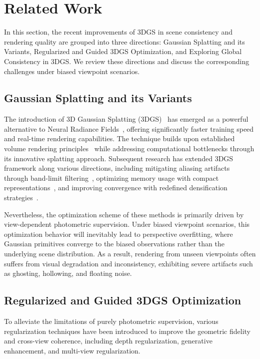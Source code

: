 \documentclass[lettersize,journal]{IEEEtran}
\begin{document}
\section{Related Work}

In this section, the recent improvements of 3DGS in scene consistency and rendering quality are grouped into three directions: Gaussian Splatting and its Variants, Regularized and Guided 3DGS Optimization, and Exploring Global Consistency in 3DGS. We review these directions and discuss the corresponding challenges under biased viewpoint scenarios.

\subsection{Gaussian Splatting and its Variants}

The introduction of 3D Gaussian Splatting (3DGS)~\cite{3dgs} has emerged as a powerful alternative to Neural Radiance Fields~\cite{nerf}, offering significantly faster training speed and real-time rendering capabilities. 
The technique builds upon established volume rendering principles~\cite{ewa} while addressing computational bottlenecks through its innovative splatting approach. 
Subsequent research has extended 3DGS framework along various directions, including mitigating aliasing artifacts through band-limit filtering~\cite{mipsplatting}, optimizing memory usage with compact representations~\cite{scaffold,hi-lsplat}, and improving convergence with redefined densification strategies~\cite{ekf-gs,densesplat,steepgs,mcmc}.

Nevertheless,
the optimization scheme of these methods is primarily driven by view-dependent photometric supervision. Under biased viewpoint scenarios, this optimization behavior will inevitably lead to perspective overfitting, where Gaussian primitives converge to the biased observations rather than the underlying scene distribution. As a result, rendering from unseen viewpoints often suffers from visual degradation and inconsistency, exhibiting severe artifacts such as ghosting, hollowing, and floating noise.

\subsection{Regularized and Guided 3DGS Optimization}

To alleviate the limitations of purely photometric supervision, various regularization techniques have been introduced to improve the geometric fidelity and cross-view coherence, including depth regularization, generative enhancement, and multi-view regularization. 
\end{document}
